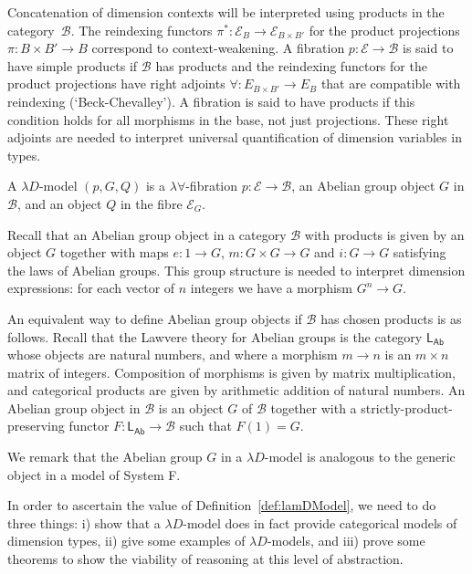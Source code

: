 \documentclass[a4paper,UKenglish]{lipics}
\newcommand{\SystemF}{System F\xspace}
\newcommand{\msf}[1]{\mathsf{#1}} %
\newcommand{\LAb}{\msf{L}_{\msf{Ab}}}
\newcommand{\B}{\mathcal{B}}
\newcommand{\E}{\mathcal{E}}
\newcommand{\fibreE}[1]{\E_{#1}}
\begin{document}
Concatenation of dimension contexts will be interpreted using products in the category~$\B$. The reindexing functors  $\pi^\ast:\E_{B}\to \E_{B\times B'}$ for the product projections $\pi:B\times B'\to B$ correspond to context-weakening. A fibration $p:\E\to \B$ is said to have simple products if $\B$ has products and the reindexing functors for the product projections have right adjoints $\forall:E_{B\times B'}\to E_B$ that are compatible with reindexing (`Beck-Chevalley'). A fibration is said to have products if this condition holds for all morphisms in the base, not just projections. These right adjoints are needed to interpret universal quantification of dimension variables in types.

\begin{definition}\label{def:lamDModel}
A $\lambda D$-model $(p,G, Q)$ is a $\lambda \forall$-fibration $p:\E\to \B$, an Abelian group object $G$ in $\B$, and an object $Q$ in the fibre $\fibreE{G}$.
\end{definition}

Recall that an Abelian group object in a category $\B$ with products is given by an object $G$ together with maps $e:1\to G$, $m:G\times G\to G$ and $i:G\to G$ satisfying the laws of Abelian groups. This group structure is needed to interpret dimension expressions: for each vector of $n$ integers we have a morphism $G^n\to G$.

An equivalent way to define Abelian group objects if $\B$ has chosen products is as follows. Recall that the Lawvere theory for Abelian groups is the category $\LAb$ whose objects are natural numbers, and where a morphism $m\to n$ is an $m\times n$ matrix of integers. Composition of morphisms is given by matrix multiplication, and categorical products are given by arithmetic addition of natural numbers. An Abelian group object in $\B$ is an object $G$ of $\B$ together with a strictly-product-preserving functor $F:\LAb\to\B$ such that $F(1)=G$.

We remark that the Abelian group $G$ in a $\lambda D$-model is analogous to the generic object in a model of \SystemF.

In order to ascertain the value of Definition~\ref{def:lamDModel}, we need to do three things: i) show that a $\lambda D$-model does in fact provide categorical models of dimension types, ii) give some examples of $\lambda D$-models, and iii) prove some theorems to show the viability of reasoning at this level of abstraction.
\end{document}
